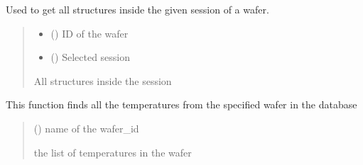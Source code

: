 \documentclass[letterpaper,10pt,english]{sphinxmanual}
\begin{document}

\begin{fulllineitems}
\label{\detokenize{getter:getter.get_structures}}
\pysigstartsignatures
{}
\pysigstopsignatures
\sphinxAtStartPar
Used to get all structures  inside the given session of a wafer.
\begin{quote}\begin{description}
\begin{itemize}
\item {} 
\sphinxAtStartPar
{} () \textendash{} ID of the wafer

\item {} 
\sphinxAtStartPar
{} () \textendash{} Selected session

\end{itemize}

\sphinxAtStartPar
All structures inside the session

\end{description}\end{quote}

\end{fulllineitems}


\begin{fulllineitems}
\label{\detokenize{getter:getter.get_temps}}
\pysigstartsignatures
{}
\pysigstopsignatures
\sphinxAtStartPar
This function finds all the temperatures from the specified wafer in the database
\begin{quote}\begin{description}
\sphinxAtStartPar
{} () \textendash{} name of the wafer\_id

\sphinxAtStartPar
the list of temperatures in the wafer

\end{description}\end{quote}

\end{fulllineitems}
\end{document}
